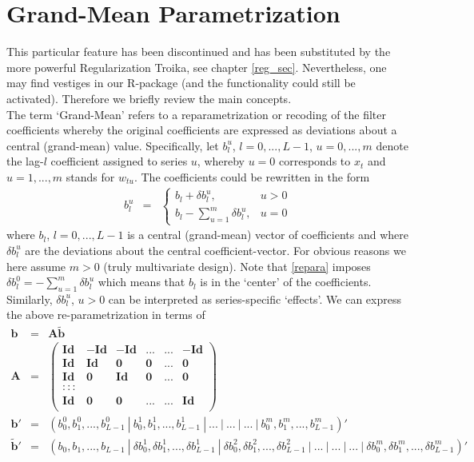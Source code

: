\documentclass[a4paper]{book}
\begin{document}
\section{Grand-Mean Parametrization}\label{gm_par}


This particular feature has been discontinued and has been substituted by the more powerful Regularization Troika, see chapter \ref{reg_sec}. Nevertheless, one may find vestiges in our R-package (and the functionality could still be activated). Therefore we briefly review the main concepts.\\

The term `Grand-Mean' refers to a reparametrization or recoding of the filter coefficients whereby the original coefficients are expressed as deviations about a central (grand-mean) value. Specifically, let $b_l^u$, $l=0,...,L-1$, $u=0,...,m$ denote the lag-$l$ coefficient assigned to series $u$, whereby $u=0$ corresponds to $x_t$ and $u=1,...,m$ stands for $w_{tu}$. The coefficients could be rewritten in the form
\begin{eqnarray}\label{repara}
b_{l}^u&=&\left\{\begin{array} {cc}b_l+\delta b_l^u, &u>0\\
b_l-\sum_{u=1}^m\delta b_l^{u}, &u=0\end{array}\right.
\end{eqnarray}
where $b_l$, $l=0,...,L-1$ is a central (grand-mean) vector of coefficients and where $\delta b_l^u$ are the deviations about the central coefficient-vector. For obvious reasons we here assume $m>0$ (truly multivariate design). Note that \ref{repara} imposes  $\delta b_l^0=-\sum_{u=1}^m\delta b_l^{u}$ which means that $b_l$ is in the `center' of the coefficients. Similarly,  $\delta b_l^u$, $u>0$ can be interpreted as series-specific `effects'. We can express the above re-parametrization in terms of
\begin{eqnarray}
\mathbf{b}&=&\mathbf{A} \mathbf{\tilde{b}}\label{btild}\\
\mathbf{A}&=&\left(\begin{array}{cccccc} \mathbf{Id}&\mathbf{-Id}&\mathbf{-Id}&...             &...&\mathbf{-Id}\\
                                                            \mathbf{Id}&\mathbf{Id}&\mathbf{0}&\mathbf{0}&...&\mathbf{0}\\
                                                            \mathbf{Id}&\mathbf{0}&\mathbf{Id}&\mathbf{0}&...&\mathbf{0}\\
:::\\
                                                            \mathbf{Id}&\mathbf{0}&\mathbf{0}&...&...&\mathbf{Id}\\
\end{array}\right)\nonumber\\
\mathbf{b}'&=&\left(b_0^0, b_1^0 ,...,b_{L-1}^0~|~ b_0^1, b_1^1,...,b_{L-1}^1~|~...~|~...~|~...~|~  b_0^m, b_1^m,..., b_{L-1}^m\right)'\nonumber\\
\mathbf{\tilde{b}}'&=&\left(b_0, b_1 ,...,b_{L-1}~|~ \delta b_0^1,\delta b_1^1,...,\delta b_{L-1}^1~|~ \delta b_0^2,\delta b_1^2,...,\delta b_{L-1}^2~|~...~|~...~|~...~|~ \delta b_0^m,\delta b_1^m,...,\delta b_{L-1}^m\right)'\nonumber
\end{eqnarray} 
\end{document}
